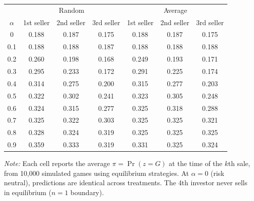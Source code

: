 \begingroup
\centering
\small
\begin{tabular}{c|ccc|ccc}
\toprule
 & \multicolumn{3}{c|}{Random} & \multicolumn{3}{c}{Average} \\
$\alpha$ & 1st seller & 2nd seller & 3rd seller & 1st seller & 2nd seller & 3rd seller \\
\midrule
0 & 0.188 & 0.187 & 0.175 & 0.188 & 0.187 & 0.175 \\
0.1 & 0.188 & 0.188 & 0.187 & 0.188 & 0.188 & 0.188 \\
0.2 & 0.260 & 0.198 & 0.168 & 0.249 & 0.193 & 0.171 \\
0.3 & 0.295 & 0.233 & 0.172 & 0.291 & 0.225 & 0.174 \\
0.4 & 0.314 & 0.275 & 0.200 & 0.315 & 0.277 & 0.203 \\
0.5 & 0.322 & 0.302 & 0.241 & 0.323 & 0.305 & 0.248 \\
0.6 & 0.324 & 0.315 & 0.277 & 0.325 & 0.318 & 0.288 \\
0.7 & 0.325 & 0.322 & 0.303 & 0.325 & 0.325 & 0.321 \\
0.8 & 0.328 & 0.324 & 0.319 & 0.325 & 0.325 & 0.325 \\
0.9 & 0.359 & 0.333 & 0.319 & 0.331 & 0.325 & 0.324 \\
\bottomrule
\end{tabular}
\par
\vspace{0.5em}
\footnotesize
\textit{Note:} Each cell reports the average $\pi = \Pr(z = G)$ at the time of the $k$th sale, from 10{,}000 simulated games using equilibrium strategies.
At $\alpha = 0$ (risk neutral), predictions are identical across treatments.
The 4th investor never sells in equilibrium ($n=1$ boundary).
\endgroup
